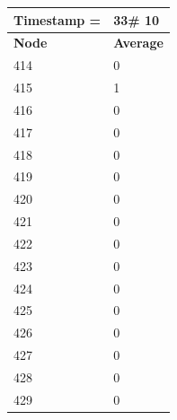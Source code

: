 \begin{tabular}{|l||l|}
\hline
\textbf{Timestamp =} & \textbf{33}\# 10\\\hline
	\textbf{Node} & \textbf{Average} \\ \hline
\hline
	414 & 0 \\ \hline
	415 & 1 \\ \hline
	416 & 0 \\ \hline
	417 & 0 \\ \hline
	418 & 0 \\ \hline
	419 & 0 \\ \hline
	420 & 0 \\ \hline
	421 & 0 \\ \hline
	422 & 0 \\ \hline
	423 & 0 \\ \hline
	424 & 0 \\ \hline
	425 & 0 \\ \hline
	426 & 0 \\ \hline
	427 & 0 \\ \hline
	428 & 0 \\ \hline
	429 & 0 \\ \hline
\end{tabular}

